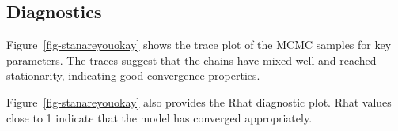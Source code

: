 \documentclass[
  letterpaper,
  DIV=11,
  numbers=noendperiod]{scrartcl}
\begin{document}
\hypertarget{diagnostics}{%
\subsection{Diagnostics}\label{diagnostics}}

Figure~\ref{fig-stanareyouokay} shows the trace plot of the MCMC samples
for key parameters. The traces suggest that the chains have mixed well
and reached stationarity, indicating good convergence properties.

Figure~\ref{fig-stanareyouokay} also provides the Rhat diagnostic plot.
Rhat values close to 1 indicate that the model has converged
appropriately.

\begin{figure}

\begin{minipage}[t]{0.50\linewidth}

{\centering 


}

\end{minipage}%
%
\begin{minipage}[t]{0.50\linewidth}

{\centering 

}
\end{minipage}
\end{figure}
\end{document}
